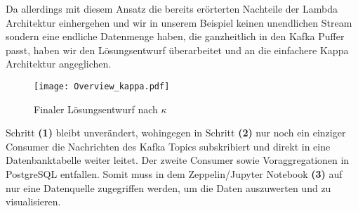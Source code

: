 Da allerdings mit diesem Ansatz die bereits erörterten Nachteile der Lambda Architektur einhergehen und wir in unserem Beispiel keinen unendlichen Stream sondern eine endliche Datenmenge haben, die ganzheitlich in den Kafka Puffer passt, haben wir den Lösungsentwurf überarbeitet und an die einfachere Kappa Architektur angeglichen.

\begin{figure}[h] %
	\centering
	\texttt{[image: Overview\_kappa.pdf]}
	\caption[Finaler Lösungsentwurf nach $\kappa$]{Finaler Lösungsentwurf nach $\kappa$}
	\label{fig:OurKappaArchitecture}
\end{figure}

Schritt \textbf{(1)} bleibt unverändert, wohingegen in Schritt \textbf{(2)} nur noch ein einziger Consumer die Nachrichten des Kafka Topics subskribiert und direkt in eine Datenbanktabelle weiter leitet. Der zweite Consumer sowie Voraggregationen in PostgreSQL entfallen.  Somit muss in dem Zeppelin/Jupyter Notebook \textbf{(3)} auf nur eine Datenquelle zugegriffen werden, um die Daten auszuwerten und zu visualisieren.


